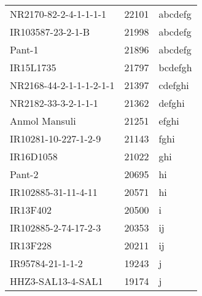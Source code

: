\documentclass[]{article}
\begin{document}
\begin{longtable}{lll}
NR2170-82-2-4-1-1-1-1 & 22101 & abcdefg\\
\rowcolor{gray!6}  IR103587-23-2-1-B & 21998 & abcdefg\\
Pant-1 & 21896 & abcdefg\\
\addlinespace
\rowcolor{gray!6}  IR15L1735 & 21797 & bcdefgh\\
NR2168-44-2-1-1-1-2-1-1 & 21397 & cdefghi\\
\rowcolor{gray!6}  NR2182-33-3-2-1-1-1 & 21362 & defghi\\
Anmol Mansuli & 21251 & efghi\\
\rowcolor{gray!6}  IR10281-10-227-1-2-9 & 21143 & fghi\\
\addlinespace
IR16D1058 & 21022 & ghi\\
\rowcolor{gray!6}  Pant-2 & 20695 & hi\\
IR102885-31-11-4-11 & 20571 & hi\\
\rowcolor{gray!6}  IR13F402 & 20500 & i\\
IR102885-2-74-17-2-3 & 20353 & ij\\
\addlinespace
\rowcolor{gray!6}  IR13F228 & 20211 & ij\\
IR95784-21-1-1-2 & 19243 & j\\
\rowcolor{gray!6}  HHZ3-SAL13-4-SAL1 & 19174 & j\\
\bottomrule
\end{longtable}
\endgroup{}
\begingroup\fontsize{12}{14}\selectfont
\end{document}
